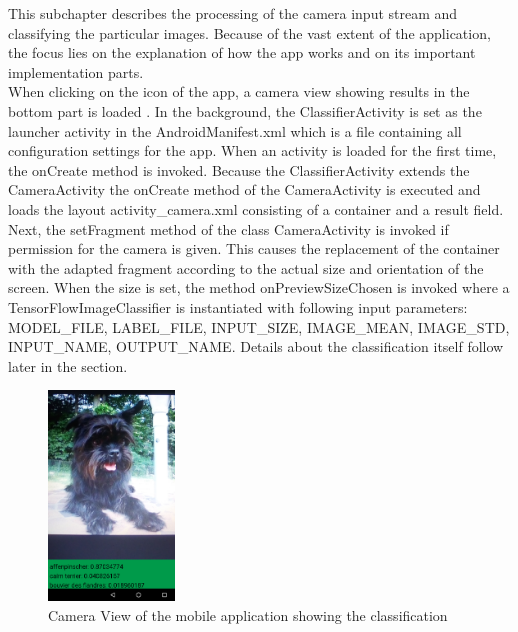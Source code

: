 This subchapter describes the processing of the camera input stream and classifying the particular images. Because of the vast extent of the application, the focus lies on the explanation of how the app works and on its important implementation parts. \\

When clicking on the icon of the app, a camera view showing results in the bottom part is loaded . In the background, the ClassifierActivity is set as the launcher activity in the AndroidManifest.xml which is a file containing all configuration settings for the app. When an activity is loaded for the first time, the onCreate method is invoked. Because the ClassifierActivity extends the CameraActivity the onCreate method of the CameraActivity is executed and loads the layout activity_camera.xml consisting of a container and a result field. Next, the setFragment method of the class CameraActivity is invoked if permission for the camera is given. This causes the replacement of the container with the adapted fragment according to the actual size and orientation of the screen. When the size is set, the method onPreviewSizeChosen is invoked where a TensorFlowImageClassifier is instantiated with following input parameters: MODEL_FILE, LABEL_FILE, INPUT_SIZE, IMAGE_MEAN, IMAGE_STD, INPUT_NAME, OUTPUT_NAME. Details about the classification itself follow later in the section.\\

\begin{figure}[htbp]
\centering
\includegraphics[width=0.3\textwidth]{includes/mobileapp}
\caption{Camera View of the mobile application showing the classification}
\label{fig:mobileapp}
\end{figure}

